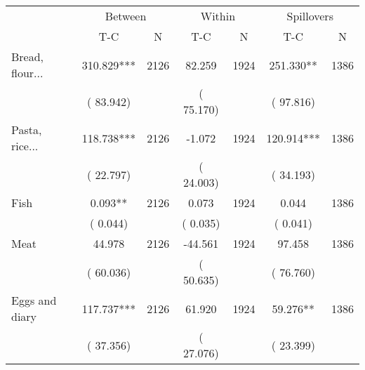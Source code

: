 
\begin{tabular}{l*{6}{c}}\hline&\multicolumn{2}{c}{Between}&\multicolumn{2}{c}{Within}&\multicolumn{2}{c}{Spillovers} \\ \cmidrule(r){2-3}\cmidrule(l){4-5}\cmidrule(l){6-7} & {T-C} & {N} & {T-C} & {N}  & {T-C}  & {N}  \\ \midrule
Bread, flour...        &            310.829***      &       2126       &             82.259      &       1924       &            251.330**      &       1386       \\
                       &       (      83.942)            &                               &       (      75.170)            &                               &       (      97.816)            &                               \\
Pasta, rice...        &            118.738***      &       2126       &             -1.072      &       1924       &            120.914***      &       1386       \\
                       &       (      22.797)            &                               &       (      24.003)            &                               &       (      34.193)            &                               \\
Fish        &              0.093**      &       2126       &              0.073      &       1924       &              0.044      &       1386       \\
                       &       (       0.044)            &                               &       (       0.035)            &                               &       (       0.041)            &                               \\
Meat        &             44.978      &       2126       &            -44.561      &       1924       &             97.458      &       1386       \\
                       &       (      60.036)            &                               &       (      50.635)            &                               &       (      76.760)            &                               \\
Eggs and diary        &            117.737***      &       2126       &             61.920      &       1924       &             59.276**      &       1386       \\
                       &       (      37.356)            &                               &       (      27.076)            &                               &       (      23.399)            &                               \\

\end{tabular}
